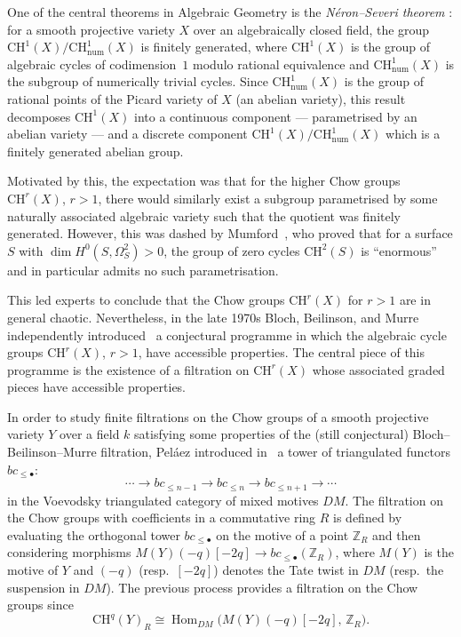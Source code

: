 \documentclass[12pt,a4paper]{article}
\theoremstyle{definition}
\newcommand{\Hom}{\operatorname{Hom}}
\newcommand{\CH}{\mathrm{CH}}
\newcommand{\Z}{\mathbb{Z}}
\begin{document}
One of the central theorems in Algebraic Geometry is the \emph{Néron–Severi theorem}
\cite{Sev34,Ner52a,Ner52b}: for a smooth projective variety $X$ over an algebraically
closed field, the group $\CH^1(X)/\CH^1_{\mathrm{num}}(X)$ is finitely generated,
where $\CH^1(X)$ is the group of algebraic cycles of codimension~$1$ modulo rational
equivalence and $\CH^1_{\mathrm{num}}(X)$ is the subgroup of numerically trivial
cycles.  Since $\CH^1_{\mathrm{num}}(X)$ is the group of rational points of the Picard
variety of $X$ (an abelian variety), this result decomposes $\CH^1(X)$ into a
continuous component — parametrised by an abelian variety — and a discrete component
$\CH^1(X)/\CH^1_{\mathrm{num}}(X)$ which is a finitely generated abelian group.

Motivated by this, the expectation was that for the higher Chow groups $\CH^r(X)$,
$r>1$, there would similarly exist a subgroup parametrised by some naturally associated
algebraic variety such that the quotient was finitely generated.  However, this was
dashed by Mumford~\cite{Mum69}, who proved that for a surface $S$ with
$\dim H^0(S,\Omega_S^2)>0$, the group of zero cycles $\CH^2(S)$ is ``enormous'' and
in particular admits no such parametrisation.

This led experts to conclude that the Chow groups $\CH^r(X)$ for $r>1$ are in
general chaotic.  Nevertheless, in the late 1970s Bloch, Beilinson, and Murre
independently introduced~\cite{Blo80,Bei87,Mur93} a conjectural programme in which the
algebraic cycle groups $\CH^r(X)$, $r>1$, have accessible properties.  The central
piece of this programme is the existence of a filtration on $\CH^r(X)$ whose
associated graded pieces have accessible properties.

In order to study finite filtrations on the Chow groups of a smooth projective variety
$Y$ over a field $k$ satisfying some properties of the (still conjectural)
Bloch–Beilinson–Murre filtration, Peláez introduced in~\cite{Pel14} a tower of
triangulated functors $bc_{\leq\bullet}$:
\[
  \cdots \to bc_{\leq n-1} \to bc_{\leq n} \to bc_{\leq n+1} \to \cdots
\]
in the Voevodsky triangulated category of mixed motives $DM$.  The filtration on the
Chow groups with coefficients in a commutative ring $R$ is defined by evaluating the
orthogonal tower $bc_{\leq\bullet}$ on the motive of a point $\Z_R$ and then
considering morphisms $M(Y)(-q)[-2q] \to bc_{\leq\bullet}(\Z_R)$, where $M(Y)$ is
the motive of $Y$ and $(-q)$ (resp.\ $[-2q]$) denotes the Tate twist in $DM$
(resp.\ the suspension in $DM$).  The previous process provides a filtration on the
Chow groups since
\[
  \CH^q(Y)_R \cong \Hom_{DM}\!\bigl(M(Y)(-q)[-2q],\,\Z_R\bigr).
\]
\end{document}
